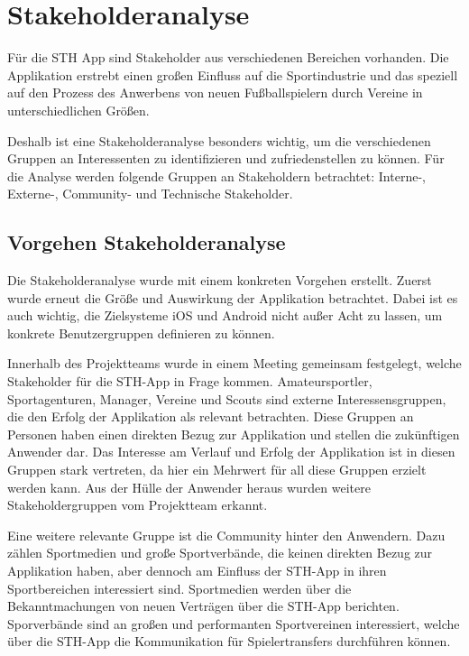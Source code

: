 \chapter{Stakeholderanalyse}

Für die STH App sind Stakeholder aus verschiedenen Bereichen vorhanden.
Die Applikation erstrebt einen großen Einfluss auf die Sportindustrie und das speziell auf den Prozess des Anwerbens von neuen Fußballspielern durch Vereine in unterschiedlichen Größen.

\noindent
Deshalb ist eine Stakeholderanalyse besonders wichtig, um die verschiedenen Gruppen an Interessenten zu identifizieren und zufriedenstellen zu können.
Für die Analyse werden folgende Gruppen an Stakeholdern betrachtet: Interne-, Externe-, Community- und Technische Stakeholder.

\section{Vorgehen Stakeholderanalyse}

Die Stakeholderanalyse wurde mit einem konkreten Vorgehen erstellt.
Zuerst wurde erneut die Größe und Auswirkung der Applikation betrachtet.
Dabei ist es auch wichtig, die Zielsysteme iOS und Android nicht außer Acht zu lassen, um konkrete Benutzergruppen definieren zu können.

\noindent
Innerhalb des Projektteams wurde in einem Meeting gemeinsam festgelegt, welche Stakeholder für die STH-App in Frage kommen.
Amateursportler, Sportagenturen, Manager, Vereine und Scouts sind externe Interessensgruppen, die den Erfolg der Applikation als relevant betrachten.
Diese Gruppen an Personen haben einen direkten Bezug zur Applikation und stellen die zukünftigen Anwender dar.
Das Interesse am Verlauf und Erfolg der Applikation ist in diesen Gruppen stark vertreten, da hier ein Mehrwert für all diese Gruppen erzielt werden kann.
Aus der Hülle der Anwender heraus wurden weitere Stakeholdergruppen vom Projektteam erkannt.

\noindent
Eine weitere relevante Gruppe ist die Community hinter den Anwendern.
Dazu zählen Sportmedien und große Sportverbände, die keinen direkten Bezug zur Applikation haben, aber dennoch am Einfluss der STH-App in ihren Sportbereichen interessiert sind.
Sportmedien werden über die Bekanntmachungen von neuen Verträgen über die STH-App berichten.
Sporverbände sind an großen und performanten Sportvereinen interessiert, welche über die STH-App die Kommunikation für Spielertransfers durchführen können.

